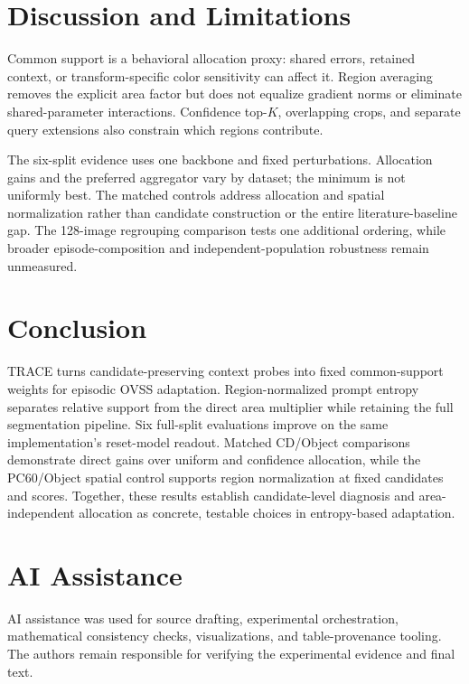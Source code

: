 \documentclass[letterpaper]{article}
\begin{document}
\clearpage
\section{Discussion and Limitations}
Common support is a behavioral allocation proxy: shared errors, retained context, or transform-specific color sensitivity can affect it. Region averaging removes the explicit area factor but does not equalize gradient norms or eliminate shared-parameter interactions. Confidence top-$K$, overlapping crops, and separate query extensions also constrain which regions contribute.

The six-split evidence uses one backbone and fixed perturbations. Allocation gains and the preferred aggregator vary by dataset; the minimum is not uniformly best. The matched controls address allocation and spatial normalization rather than candidate construction or the entire literature-baseline gap. The 128-image regrouping comparison tests one additional ordering, while broader episode-composition and independent-population robustness remain unmeasured.

\section{Conclusion}
TRACE turns candidate-preserving context probes into fixed common-support weights for episodic OVSS adaptation. Region-normalized prompt entropy separates relative support from the direct area multiplier while retaining the full segmentation pipeline. Six full-split evaluations improve on the same implementation's reset-model readout. Matched CD/Object comparisons demonstrate direct gains over uniform and confidence allocation, while the PC60/Object spatial control supports region normalization at fixed candidates and scores. Together, these results establish candidate-level diagnosis and area-independent allocation as concrete, testable choices in entropy-based adaptation.

\section*{AI Assistance}
AI assistance was used for source drafting, experimental orchestration, mathematical consistency checks, visualizations, and table-provenance tooling. The authors remain responsible for verifying the experimental evidence and final text.


\clearpage
\appendix

\end{document}
